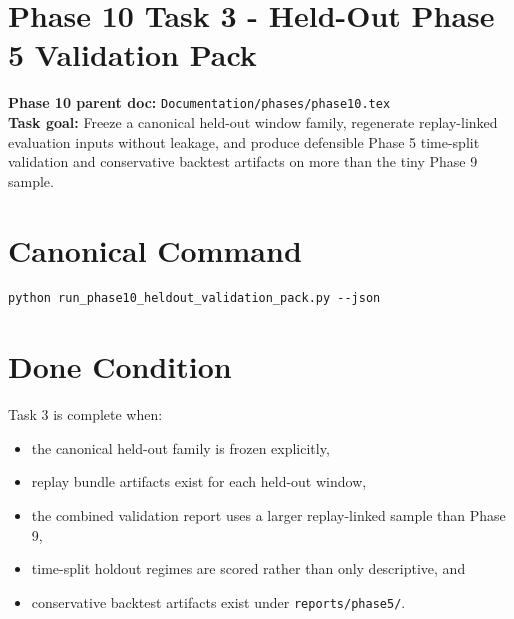 \documentclass{article}
\begin{document}
\section*{Phase 10 Task 3 - Held-Out Phase 5 Validation Pack}

\textbf{Phase 10 parent doc:} \texttt{Documentation/phases/phase10.tex}\\
\textbf{Task goal:} Freeze a canonical held-out window family, regenerate replay-linked evaluation inputs without leakage, and produce defensible Phase 5 time-split validation and conservative backtest artifacts on more than the tiny Phase 9 sample.

\section*{Canonical Command}
\begin{verbatim}
python run_phase10_heldout_validation_pack.py --json
\end{verbatim}

\section*{Done Condition}
Task 3 is complete when:
\begin{itemize}
\item the canonical held-out family is frozen explicitly,
\item replay bundle artifacts exist for each held-out window,
\item the combined validation report uses a larger replay-linked sample than Phase 9,
\item time-split holdout regimes are scored rather than only descriptive, and
\item conservative backtest artifacts exist under \texttt{reports/phase5/}.
\end{itemize}
\end{document}
